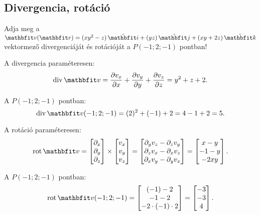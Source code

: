 \documentclass[fleqn]{szb-practice}
\begin{document}

\subsection{Divergencia, rotáció}

Adja meg a $\rvec v(\coordvec) = \ijk{x y^2 - z}{y z}{x y + 2 z}$ vektormező
divergenciáját és rotációját a $P(-1; 2; -1)$ pontban!

A divergencia paraméteresen:
\begin{equation*}
  \Div \rvec v
  = \pdv{v_x}{x} + \pdv{v_y}{y} + \pdv{v_z}{z}
  = y^2 + z + 2
  \text.
\end{equation*}

A $P(-1; 2; -1)$ pontban:
\begin{equation*}
  \Div \rvec v(-1; 2; -1)
  = (2)^2 + (-1) + 2
  = 4 - 1 + 2
  = 5
  \text.
\end{equation*}

A rotáció paraméteresen:
\begin{equation*}
  \rot \rvec v = \begin{bmatrix}
    \partial_x \\ \partial_y \\ \partial_z
  \end{bmatrix} \times \begin{bmatrix}
    v_x \\ v_y \\ v_z
  \end{bmatrix} = \begin{bmatrix}
    \partial_y v_z - \partial_z v_y \\
    \partial_z v_x - \partial_x v_z \\
    \partial_x v_y - \partial_y v_x
  \end{bmatrix} = \begin{bmatrix}
    x - y  \\
    -1 - y \\
    -2xy
  \end{bmatrix}
  \text.
\end{equation*}

A $P(-1; 2; -1)$ pontban:
\begin{equation*}
  \rot \rvec v(-1; 2; -1)
  = \begin{bmatrix}
    (-1) - 2 \\
    -1 - 2   \\
    -2 \cdot (-1) \cdot 2
  \end{bmatrix} = \begin{bmatrix}
    -3 \\
    -3 \\
    4
  \end{bmatrix}
  \text.
\end{equation*}
\end{document}
